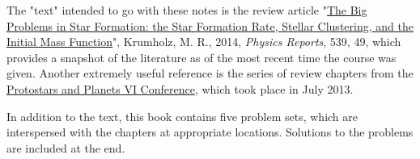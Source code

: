 \documentclass{tufte-book} %
\begin{document}
The "text" intended to go with these notes is the review article "\href{http://adsabs.harvard.edu/abs/2014arXiv1402.0867K}{The Big Problems in Star Formation: the Star Formation Rate, Stellar Clustering, and the Initial Mass Function}", Krumholz, M. R., 2014, \textit{Physics Reports}, 539, 49, which provides a snapshot of the literature as of the most recent time the course was given. Another extremely useful reference is the series of review chapters from the \href{http://www.mpia.de/homes/ppvi/}{Protostars and Planets VI Conference}, which took place in July 2013.

In addition to the text, this book contains five problem sets, which are interspersed with the chapters at appropriate locations. Solutions to the problems are included at the end.











\end{document}
